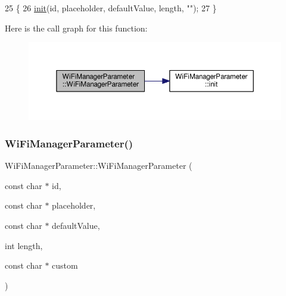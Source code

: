 \begin{DoxyCode}
25                                                                                                            
                   \{
26   \hyperlink{class_wi_fi_manager_parameter_a137b764027d3851a428f3ab185a5660f}{init}(\textcolor{keywordtype}{id}, placeholder, defaultValue, length, \textcolor{stringliteral}{""});
27 \}
\end{DoxyCode}
Here is the call graph for this function\+:\nopagebreak
\begin{figure}[H]
\begin{center}
\leavevmode
\includegraphics[width=350pt]{d7/d08/class_wi_fi_manager_parameter_a8e55ac907530d04ab60d30045e1382a1_cgraph}
\end{center}
\end{figure}
\mbox{\label{class_wi_fi_manager_parameter_a45967e1d29d52f5fc8e47e99cb693b98}} 
\subsubsection{\texorpdfstring{Wi\+Fi\+Manager\+Parameter()}{WiFiManagerParameter()}\hspace{0.1cm}{\footnotesize\ttfamily [3/3]}}
{\footnotesize\ttfamily Wi\+Fi\+Manager\+Parameter\+::\+Wi\+Fi\+Manager\+Parameter (\begin{DoxyParamCaption}\item[{const char $\ast$}]{id,  }\item[{const char $\ast$}]{placeholder,  }\item[{const char $\ast$}]{default\+Value,  }\item[{int}]{length,  }\item[{const char $\ast$}]{custom }\end{DoxyParamCaption})}



